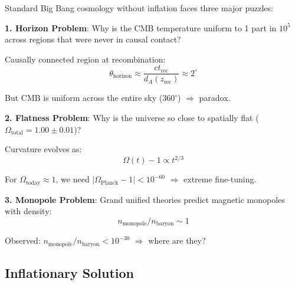 \begin{defn}\label{def:bigbang-problems}
Standard Big Bang cosmology without inflation faces three major puzzles\cite{guth1981,linde1982}:

\textbf{1. Horizon Problem}: Why is the CMB temperature uniform to 1 part in $10^5$ across regions that were never in causal contact?

Causally connected region at recombination:
\begin{equation}
\theta_{\text{horizon}} \approx \frac{c t_{\text{rec}}}{d_A(z_{\text{rec}})} \approx 2^\circ
\end{equation}

But CMB is uniform across the entire sky ($360^\circ$) $\Rightarrow$ paradox.

\textbf{2. Flatness Problem}: Why is the universe so close to spatially flat ($\Omega_{\text{total}} = 1.00 \pm 0.01$)?

Curvature evolves as:
\begin{equation}
\Omega(t) - 1 \propto t^{2/3}
\end{equation}

For $\Omega_{\text{today}} \approx 1$, we need $|\Omega_{\text{Planck}} - 1| < 10^{-60}$ $\Rightarrow$ extreme fine-tuning.

\textbf{3. Monopole Problem}: Grand unified theories predict magnetic monopoles with density:
\begin{equation}
n_{\text{monopole}} / n_{\text{baryon}} \sim 1
\end{equation}

Observed: $n_{\text{monopole}} / n_{\text{baryon}} < 10^{-30}$ $\Rightarrow$ where are they?
\end{defn}

\subsection{Inflationary Solution}

